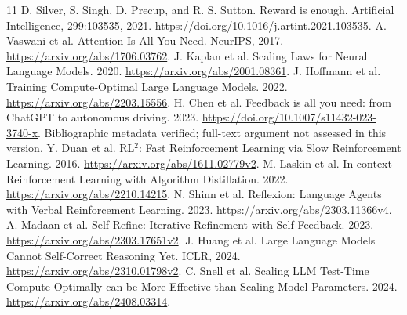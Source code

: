 \documentclass[11pt]{article}
\begin{document}
\begin{thebibliography}{11}
 D. Silver, S. Singh, D. Precup, and R. S. Sutton.
Reward is enough. Artificial Intelligence, 299:103535, 2021.
\url{https://doi.org/10.1016/j.artint.2021.103535}.
 A. Vaswani et al. Attention Is All You Need. NeurIPS, 2017.
\url{https://arxiv.org/abs/1706.03762}.
 J. Kaplan et al. Scaling Laws for Neural Language Models. 2020.
\url{https://arxiv.org/abs/2001.08361}.
 J. Hoffmann et al. Training Compute-Optimal Large Language Models. 2022.
\url{https://arxiv.org/abs/2203.15556}.
 H. Chen et al. Feedback is all you need: from ChatGPT to autonomous driving. 2023.
\url{https://doi.org/10.1007/s11432-023-3740-x}. Bibliographic metadata verified;
full-text argument not assessed in this version.
 Y. Duan et al. RL$^2$: Fast Reinforcement Learning via Slow Reinforcement Learning. 2016.
\url{https://arxiv.org/abs/1611.02779v2}.
 M. Laskin et al. In-context Reinforcement Learning with Algorithm Distillation. 2022.
\url{https://arxiv.org/abs/2210.14215}.
 N. Shinn et al. Reflexion: Language Agents with Verbal Reinforcement Learning. 2023.
\url{https://arxiv.org/abs/2303.11366v4}.
 A. Madaan et al. Self-Refine: Iterative Refinement with Self-Feedback. 2023.
\url{https://arxiv.org/abs/2303.17651v2}.
 J. Huang et al. Large Language Models Cannot Self-Correct Reasoning Yet. ICLR, 2024.
\url{https://arxiv.org/abs/2310.01798v2}.
 C. Snell et al. Scaling LLM Test-Time Compute Optimally can be More Effective than Scaling Model Parameters. 2024.
\url{https://arxiv.org/abs/2408.03314}.
\end{thebibliography}
\end{document}

